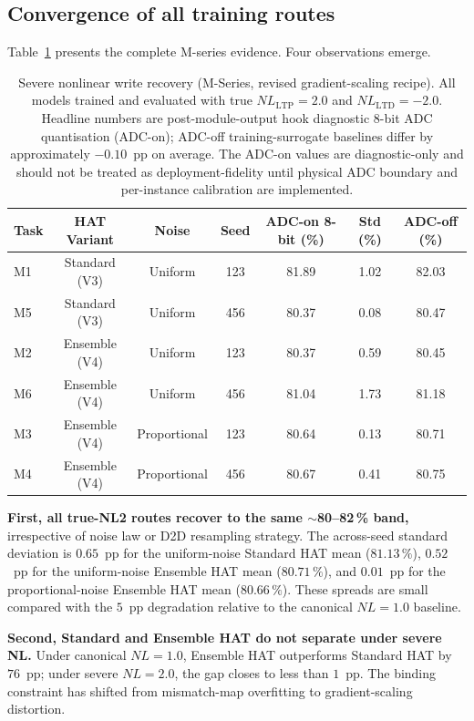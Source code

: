 \subsection{Convergence of all training routes}

Table~\ref{tab:severe-nl-recovery-c5} presents the complete M-series evidence.  Four observations emerge.

\begin{table}[htbp]
\centering
\caption{Severe nonlinear write recovery (M-Series, revised gradient-scaling recipe).  All models trained and evaluated with true $NL_{\mathrm{LTP}}=2.0$ and $NL_{\mathrm{LTD}}=-2.0$.  Headline numbers are post-module-output hook diagnostic 8-bit ADC quantisation (ADC-on); ADC-off training-surrogate baselines differ by approximately $-0.10$~pp on average. The ADC-on values are diagnostic-only and should not be treated as deployment-fidelity until physical ADC boundary and per-instance calibration are implemented.}
\label{tab:severe-nl-recovery-c5}
\begin{tabular}{@{}lcccccc@{}}
\toprule
\textbf{Task} & \textbf{HAT Variant} & \textbf{Noise} & \textbf{Seed} & \textbf{ADC-on 8-bit (\%)} & \textbf{Std (\%)} & \textbf{ADC-off (\%)} \\
\midrule
M1 & Standard (V3) & Uniform & 123 & 81.89 & 1.02 & 82.03 \\
M5 & Standard (V3) & Uniform & 456 & 80.37 & 0.08 & 80.47 \\
M2 & Ensemble (V4) & Uniform & 123 & 80.37 & 0.59 & 80.45 \\
M6 & Ensemble (V4) & Uniform & 456 & 81.04 & 1.73 & 81.18 \\
M3 & Ensemble (V4) & Proportional & 123 & 80.64 & 0.13 & 80.71 \\
M4 & Ensemble (V4) & Proportional & 456 & 80.67 & 0.41 & 80.75 \\
\bottomrule
\end{tabular}
\end{table}

\textbf{First, all true-NL2 routes recover to the same $\sim$80--82\,\% band,} irrespective of noise law or D2D resampling strategy.  The across-seed standard deviation is $0.65$~pp for the uniform-noise Standard HAT mean ($81.13\,\%$), $0.52$~pp for the uniform-noise Ensemble HAT mean ($80.71\,\%$), and $0.01$~pp for the proportional-noise Ensemble HAT mean ($80.66\,\%$).  These spreads are small compared with the $5$~pp degradation relative to the canonical $NL=1.0$ baseline.

\textbf{Second, Standard and Ensemble HAT do not separate under severe NL.}  Under canonical $NL=1.0$, Ensemble HAT outperforms Standard HAT by $76$~pp; under severe $NL=2.0$, the gap closes to less than $1$~pp.  The binding constraint has shifted from mismatch-map overfitting to gradient-scaling distortion.


